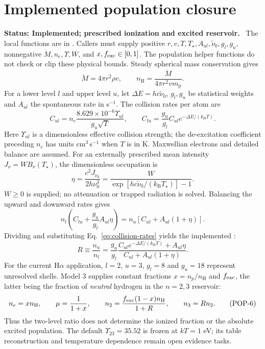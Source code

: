 \documentclass[11pt,a4paper]{article}
\newcommand{\nH}{n_{\mathrm H}}
\newcommand{\kb}{k_{\mathrm B}}
\newcommand{\mpart}{m_{\mathrm p}}
\newcommand{\wn}{\tilde\nu}
\newcommand{\status}[1]{\par\noindent\textbf{Status: #1.}\ }
\begin{document}
\section{Implemented population closure}\label{sec:populations}
\status{Implemented; prescribed ionization and excited reservoir}
The local functions are in .
Callers must supply positive $r,v,T,T_\star,A_{ul},\wn_0,g_l,g_u$,
nonnegative $\dot M,n_e,\Upsilon,W$, and $x,f_{\rm exc}\in[0,1]$.
The population helper functions do not check or clip these physical bounds.
Steady spherical mass conservation gives
\begin{equation}
 \dot M=4\pi r^2\rho v,
 \qquad \nH=\frac{\dot M}{4\pi r^2v\mpart}.
 \tag{POP-1}\label{eq:continuity}
\end{equation}
For a lower level $l$ and upper level $u$, let
$\Delta E=hc\wn_0$, $g_l,g_u$ be statistical weights and $A_{ul}$ the
spontaneous rate in s$^{-1}$. The collision rates per atom are
\begin{equation}
 C_{ul}=n_e\frac{8.629\times10^{-6}\Upsilon_{ul}}{g_u\sqrt T},
 \qquad
 C_{lu}=\frac{g_u}{g_l}C_{ul}e^{-\Delta E/(\kb T)}.
 \tag{POP-2}\label{eq:collision-rates}
\end{equation}
Here $\Upsilon_{ul}$ is a dimensionless effective collision strength; the
de-excitation coefficient preceding $n_e$ has units cm$^3$\,s$^{-1}$ when
$T$ is in K. Maxwellian electrons and detailed balance are assumed.
For an externally prescribed mean intensity $J_\nu=W B_\nu(T_\star)$,
the dimensionless occupation is
\begin{equation}
 \eta=\frac{c^2J_{\nu_0}}{2h\nu_0^3}
     =\frac{W}{\exp[hc\wn_0/(\kb T_\star)]-1}.
 \tag{POP-3}\label{eq:occupation}
\end{equation}
$W\geq0$ is supplied; no attenuation or trapped radiation is solved.
Balancing the upward and downward rates gives
\begin{equation}
 n_l\left(C_{lu}+\frac{g_u}{g_l}A_{ul}\eta\right)
 =n_u\left[C_{ul}+A_{ul}(1+\eta)\right].
 \tag{POP-4}\label{eq:two-level-balance}
\end{equation}
Dividing and substituting Eq.~\eqref{eq:collision-rates} yields the implemented
:
\begin{equation}
 R\equiv\frac{n_u}{n_l}
 =\frac{g_u}{g_l}
  \frac{C_{ul}e^{-\Delta E/(\kb T)}+A_{ul}\eta}
       {C_{ul}+A_{ul}(1+\eta)}.
 \tag{POP-5}\label{eq:two-level-ratio}
\end{equation}
For the current H$\alpha$ application, $l=2$, $u=3$, $g_l=8$ and $g_u=18$
represent unresolved shells. Model 3 supplies constant fractions
$x=n_p/\nH$ and $f_{\rm exc}$, the latter being the fraction of \emph{neutral}
hydrogen in the $n=2,3$ reservoir:
\begin{equation}
 n_e=x\nH,\qquad \mu=\frac{1}{1+x},\qquad
 n_2=\frac{f_{\rm exc}(1-x)\nH}{1+R},\qquad n_3=Rn_2.
 \tag{POP-6}\label{eq:reservoir}
\end{equation}
Thus the two-level ratio does not determine the ionized fraction or the
absolute excited population. The default $\Upsilon_{23}=35.52$ is frozen
at $kT=1$ eV; its table reconstruction and temperature dependence remain
open evidence tasks.
\end{document}
